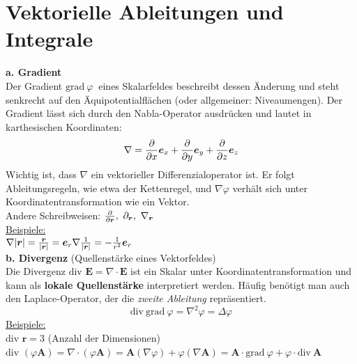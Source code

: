 \section{Vektorielle Ableitungen und Integrale}
\textbf{a. Gradient}\\
\linebreak
Der Gradient $\mathrm{grad\ }\varphi\ $ eines Skalarfeldes beschreibt dessen Änderung und steht senkrecht auf den Äquipotentialflächen (oder allgemeiner: Niveaumengen). Der Gradient lässt sich durch den Nabla-Operator ausdrücken und lautet in karthesischen Koordinaten: 
\begin{equation*}
\nabla=\frac{\partial{}}{\partial{x}}\bm{e}_x+\frac{\partial{}}{\partial{y}}\bm{e}_y+\frac{\partial{}}{\partial{z}}\bm{e}_z
\end{equation*}
Wichtig ist, dass $\nabla$ ein vektorieller Differenzialoperator ist. Er folgt Ableitungsregeln, wie etwa der Kettenregel, und $\nabla\varphi$ verhält sich unter Koordinatentransformation wie ein Vektor.\\
\linebreak
Andere Schreibweisen: $\pdiff{}{\bm{r}},\ \partial_{\bm{r}},\ \nabla_{\bm{r}}$\\
\linebreak
\underline{Beispiele:}\\
\linebreak
$\nabla |\bm{r}|=\frac{\bm{r}}{|\bm{r}|}=\bm{e}_r\\
\nabla \frac{1}{|\bm{r}|}=-\frac{1}{r^2}\bm{e}_r$\\
\linebreak\linebreak
\textbf{b. Divergenz} (Quellenstärke eines Vektorfeldes)\\
\linebreak
Die Divergenz div $\bm{E}=\nabla\cdot\bm{E}$ ist ein Skalar unter Koordinatentransformation und kann als \textbf{lokale Quellenstärke} interpretiert werden. Häufig benötigt man auch den Laplace-Operator, der die \emph{zweite Ableitung} repräsentiert.\\
\begin{equation*}
\mathrm{div\ grad\ } \varphi=\nabla^2\varphi=\Delta\varphi
\end{equation*}
\underline{Beispiele:}\\
\linebreak
div $\bm{r}=3$ (Anzahl der Dimensionen)\\
div $(\varphi\bm{A})=\nabla\cdot(\varphi\bm{A})=\bm{A}(\nabla\varphi)+\varphi(\nabla\bm{A})=\bm{A}\cdot\mathrm{grad\ }\varphi+\varphi\cdot\mathrm{div\ }\bm{A}$\\
